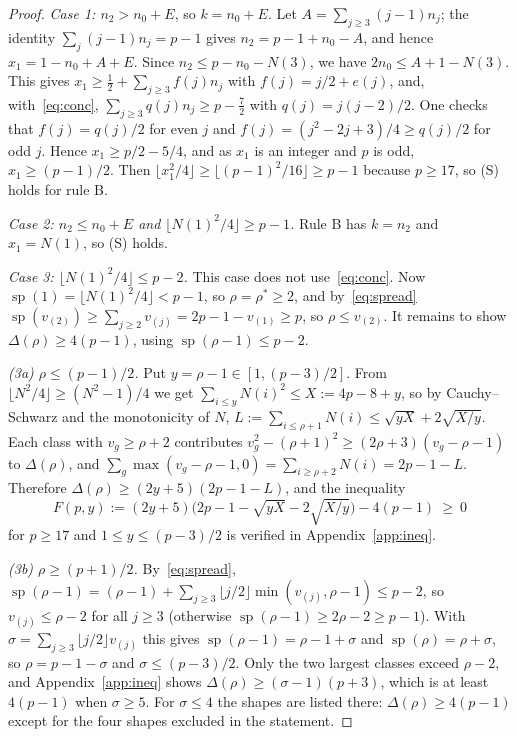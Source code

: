 \documentclass[11pt]{article}
\theoremstyle{remark}
\begin{document}
\begin{proof}
\emph{Case 1: $n_2>n_0+E$}, so $k=n_0+E$. Let $A=\sum_{j\ge3}(j-1)n_j$; the identity $\sum_j(j-1)n_j=p-1$ gives $n_2=p-1+n_0-A$, and hence $x_1=1-n_0+A+E$. Since $n_2\le p-n_0-N(3)$, we have $2n_0\le A+1-N(3)$. This gives $x_1\ge\frac12+\sum_{j\ge3}f(j)n_j$ with $f(j)=j/2+e(j)$, and, with~\eqref{eq:conc}, $\sum_{j\ge3}q(j)n_j\ge p-\frac72$ with $q(j)=j(j-2)/2$. One checks that $f(j)=q(j)/2$ for even $j$ and $f(j)=(j^2-2j+3)/4\ge q(j)/2$ for odd $j$. Hence $x_1\ge p/2-5/4$, and as $x_1$ is an integer and $p$ is odd, $x_1\ge(p-1)/2$. Then $\lfloor x_1^2/4\rfloor\ge\lfloor(p-1)^2/16\rfloor\ge p-1$ because $p\ge17$, so (S) holds for rule B.

\emph{Case 2: $n_2\le n_0+E$ and $\lfloor N(1)^2/4\rfloor\ge p-1$.} Rule B has $k=n_2$ and $x_1=N(1)$, so (S) holds.

\emph{Case 3: $\lfloor N(1)^2/4\rfloor\le p-2$.} This case does not use~\eqref{eq:conc}. Now $\operatorname{sp}(1)=\lfloor N(1)^2/4\rfloor<p-1$, so $\rho=\rho^*\ge2$, and by~\eqref{eq:spread} $\operatorname{sp}(v_{(2)})\ge\sum_{j\ge2}v_{(j)}=2p-1-v_{(1)}\ge p$, so $\rho\le v_{(2)}$. It remains to show $\Delta(\rho)\ge4(p-1)$, using $\operatorname{sp}(\rho-1)\le p-2$.

\emph{(3a) $\rho\le(p-1)/2$.} Put $y=\rho-1\in[1,(p-3)/2]$. From $\lfloor N^2/4\rfloor\ge(N^2-1)/4$ we get $\sum_{i\le y}N(i)^2\le X:=4p-8+y$, so by Cauchy--Schwarz and the monotonicity of $N$, $L:=\sum_{i\le\rho+1}N(i)\le\sqrt{yX}+2\sqrt{X/y}$. Each class with $v_g\ge\rho+2$ contributes $v_g^2-(\rho+1)^2\ge(2\rho+3)(v_g-\rho-1)$ to $\Delta(\rho)$, and $\sum_g\max(v_g-\rho-1,0)=\sum_{i\ge\rho+2}N(i)=2p-1-L$. Therefore $\Delta(\rho)\ge(2y+5)(2p-1-L)$, and the inequality
\[
F(p,y):=(2y+5)\bigl(2p-1-\sqrt{yX}-2\sqrt{X/y}\bigr)-4(p-1)\ \ge\ 0
\]
for $p\ge17$ and $1\le y\le(p-3)/2$ is verified in Appendix~\ref{app:ineq}.

\emph{(3b) $\rho\ge(p+1)/2$.} By~\eqref{eq:spread}, $\operatorname{sp}(\rho-1)=(\rho-1)+\sum_{j\ge3}\lfloor j/2\rfloor\min(v_{(j)},\rho-1)\le p-2$, so $v_{(j)}\le\rho-2$ for all $j\ge3$ (otherwise $\operatorname{sp}(\rho-1)\ge2\rho-2\ge p-1$). With $\sigma=\sum_{j\ge3}\lfloor j/2\rfloor v_{(j)}$ this gives $\operatorname{sp}(\rho-1)=\rho-1+\sigma$ and $\operatorname{sp}(\rho)=\rho+\sigma$, so $\rho=p-1-\sigma$ and $\sigma\le(p-3)/2$. Only the two largest classes exceed $\rho-2$, and Appendix~\ref{app:ineq} shows $\Delta(\rho)\ge(\sigma-1)(p+3)$, which is at least $4(p-1)$ when $\sigma\ge5$. For $\sigma\le4$ the shapes are listed there: $\Delta(\rho)\ge4(p-1)$ except for the four shapes excluded in the statement.
\end{proof}
\end{document}

